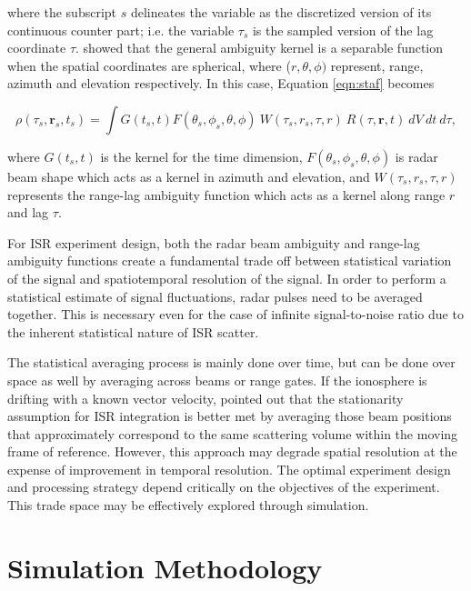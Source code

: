 \documentclass[draft,ras]{agutex}
\begin{document}
\begin{article}
\noindent where the subscript $s$ delineates the variable as the discretized version of its continuous counter part; i.e. the variable $\tau_s$ is the sampled version of the lag coordinate $\tau$. \citet{RDS:RDS20236} showed that the general ambiguity kernel is a separable function when the spatial coordinates are spherical, where ($r,\theta,\phi)$ represent, range, azimuth and elevation respectively.  In this case, Equation \ref{eqn:staf} becomes

\begin{equation}
\label{eqn:stafbrok}
\rho(\tau_s,\mathbf{r}_s,t_s)= \int G(t_s,t)F(\theta_s,\phi_s,\theta,\phi)\:W(\tau_s,r_s,\tau,r)\:R(\tau,\mathbf{r},t)\ dV\ dt\ d\tau,
\end{equation}

\noindent where $G(t_s,t)$ is the kernel for the time dimension, $F(\theta_s,\phi_s,\theta,\phi)$ is radar beam shape which acts as a kernel in azimuth and elevation, and $W(\tau_s,r_s,\tau,r) $ represents the range-lag ambiguity function which acts as a kernel along range $r$ and lag $\tau$. 

For ISR experiment design, both the radar beam ambiguity and range-lag ambiguity functions create a fundamental trade off between statistical variation of the signal and spatiotemporal resolution of the signal. In order to  perform a statistical estimate of signal fluctuations, radar pulses need to be averaged together. This is necessary even for the case of infinite signal-to-noise ratio due to the inherent statistical nature of ISR  scatter.

The statistical averaging process is mainly done over time, but can be done over space as well by averaging across beams or range gates. If the ionosphere is drifting with a known vector velocity, \citet{RDS:RDS20236} pointed out that the stationarity assumption for ISR integration is  better met by averaging those beam positions that approximately correspond to the same scattering volume within the moving frame of reference. However, this approach may degrade spatial resolution at the expense of improvement in temporal resolution.  The optimal experiment design and processing strategy depend critically on the objectives of the experiment.   This trade space may be effectively explored through simulation.

\section{Simulation Methodology}


\end{article}
\end{document}

